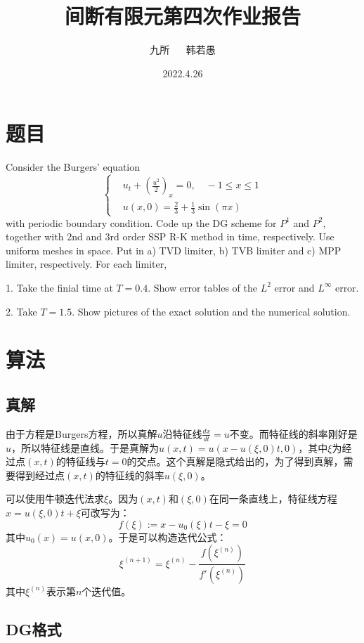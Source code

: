 \documentclass[12pt, a4paper]{ctexart}
\title{间断有限元第四次作业报告}
\author{九所 $\quad$ 韩若愚}
\date{2022.4.26}
\begin{document}
	\maketitle
	
	\tableofcontents
	
	\section{题目}
	Consider the Burgers' equation
	\begin{equation*}
	\begin{cases}
	& u_t + (\frac{u^2}{2})_x = 0, \quad -1 \leq x \leq 1\\
	& u(x,0) =\frac{2}{3} + \frac{1}{3} \sin(\pi x)
	\end{cases}
	\end{equation*}
	with periodic boundary condition. Code up the DG scheme for $P^1$ and $P^2$, together with 2nd and 3rd order SSP R-K method in time, respectively. Use uniform meshes in space. Put in a) TVD limiter, b) TVB limiter and c) MPP limiter, respectively. For each limiter, 
	
	1. Take the finial time at $T = 0.4$. Show error tables of the $L^2$ error and $L^\infty$ error.
	
	2. Take $T = 1.5$. Show pictures of the exact solution and the numerical solution.
	
	\section{算法}
	
	\subsection{真解}
	
	由于方程是Burgers方程，所以真解$u$沿特征线$ \frac{dx}{dt} = u$不变。而特征线的斜率刚好是$u$，所以特征线是直线。于是真解为$u(x,t) = u(x- u(\xi,0)t,0)$，其中$\xi$为经过点$(x,t)$的特征线与$t=0$的交点。这个真解是隐式给出的，为了得到真解，需要得到经过点$(x,t)$的特征线的斜率$u(\xi,0)$。
	
	可以使用牛顿迭代法求$\xi$。因为$(x,t)$和$(\xi,0)$在同一条直线上，特征线方程$x = u(\xi,0)t+\xi$可改写为：
	$$
	f(\xi) := x - u_0(\xi) t - \xi = 0
	$$
	其中$u_0(x) = u(x,0)$。于是可以构造迭代公式：
	$$
	\xi^{(n+1)} = \xi^{(n)} - \frac{f(\xi^{(n)})}{f'(\xi^{(n)})}
	$$
	其中$\xi^{(n)}$表示第$n$个迭代值。
	
	\subsection{DG格式}
	
\end{document}
